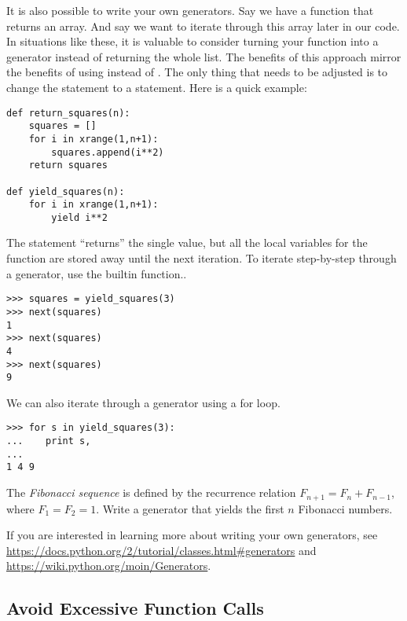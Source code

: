 It is also possible to write your own generators.
Say we have a function that returns an array.
And say we want to iterate through this array later in our code.
In situations like these, it is valuable to consider turning your function into a generator instead of returning the whole list.
The benefits of this approach mirror the benefits of using  instead of .
The only thing that needs to be adjusted is to change the  statement to a  statement.
Here is a quick example:

\begin{lstlisting}
def return_squares(n):
    squares = []
    for i in xrange(1,n+1):
        squares.append(i**2)
    return squares

def yield_squares(n):
    for i in xrange(1,n+1):
        yield i**2
\end{lstlisting}

The  statement ``returns'' the single value, but all the local variables for the function are stored away until the next iteration.
To iterate step-by-step through a generator, use the builtin  function..
\begin{lstlisting}
>>> squares = yield_squares(3)
>>> next(squares)
1
>>> next(squares)
4
>>> next(squares)
9
\end{lstlisting}

We can also iterate through a generator using a for loop.

\begin{lstlisting}
>>> for s in yield_squares(3):
...    print s,
...
1 4 9
\end{lstlisting}

\begin{problem}
The \emph{Fibonacci sequence} is defined by the recurrence relation $F_{n+1} = F_n + F_{n-1}$, where $F_1 = F_2 = 1$.
Write a generator that yields the first $n$ Fibonacci numbers.
\end{problem}

If you are interested in learning more about writing your own generators, see \url{https://docs.python.org/2/tutorial/classes.html#generators} and \url{https://wiki.python.org/moin/Generators}.

\subsection*{Avoid Excessive Function Calls} %

